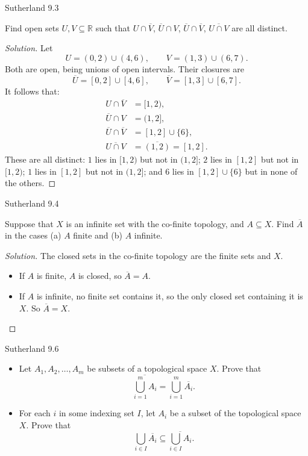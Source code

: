 \documentclass[minion]{homework}
\newcommand{\Reals}{\ensuremath{\mathbb R}}%
\begin{document}
\begin{problems}

\problem Sutherland 9.3

Find open sets $U, V \subseteq \Reals$ such that $U \cap \overline{V}$, $\overline{U} \cap V$, $\overline{U} \cap \overline{V}$, $\overline{U \cap V}$ are all distinct.

\begin{proof}[Solution]
Let
\[
U = (0,2) \cup (4,6), \qquad V = (1,3) \cup (6,7).
\]
Both are open, being unions of open intervals. Their closures are
\[
\overline{U} = [0,2] \cup [4,6], \qquad \overline{V} = [1,3] \cup [6,7].
\]
It follows that:
\begin{align*}
U \cap \overline{V} &= [1,2), \\
\overline{U} \cap V &= (1,2], \\
\overline{U} \cap \overline{V} &= [1,2] \cup \{6\}, \\
\overline{U \cap V} &= \overline{(1,2)} = [1,2].
\end{align*}
These are all distinct: $1$ lies in $[1,2)$ but not in $(1,2]$; $2$ lies in $[1,2]$ but not in $[1,2)$; $1$ lies in $[1,2]$ but not in $(1,2]$; and $6$ lies in $[1,2] \cup \{6\}$ but in none of the others.
\end{proof}

\problem Sutherland 9.4

Suppose that $X$ is an infinite set with the co-finite topology, and $A \subseteq X$. Find $\overline{A}$ in the cases (a) $A$ finite and (b) $A$ infinite.

\begin{proof}[Solution]
The closed sets in the co-finite topology are the finite sets and $X$.
\begin{itemize}
  \item[(a)] If $A$ is finite, $A$ is closed, so $\overline{A} = A$.
  \item[(b)] If $A$ is infinite, no finite set contains it, so the only closed set containing it is $X$. So $\overline{A} = X$.
\end{itemize}
\end{proof}

\problem Sutherland 9.6

\begin{itemize}
  \item[(a)] Let $A_1, A_2, \dots, A_m$ be subsets of a topological space $X$. Prove that
  \[
  \overline{\bigcup_{i=1}^{m} A_i} = \bigcup_{i=1}^{m} \overline{A_i}.
  \]
  \item[(b)] For each $i$ in some indexing set $I$, let $A_i$ be a subset of the topological space $X$. Prove that
  \[
  \bigcup_{i \in I} \overline{A_i} \subseteq \overline{\bigcup_{i \in I} A_i}.
  \]
\end{itemize}


\end{problems}
\end{document}
